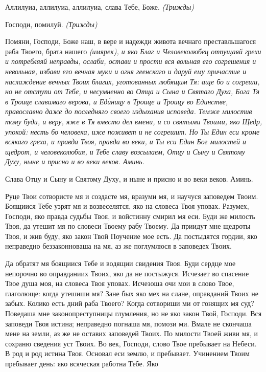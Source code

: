    Аллилуиа, аллилуиа, аллилуиа, слава Тебе, Боже. \itshape (Трижды)\normalfont{}


   Господи, помилуй. \itshape (Трижды)\normalfont{}


   Помяни, Господи, Боже наш, в вере и надежди живота вечнаго преставльшагося
раба Твоего, брата нашего \itshape (имярек)\normalfont{}, и яко Благ и Человеколюбец отпущаяй
грехи и потребляяй неправды, ослаби, остави и прости вся вольная его
согрешения и невольная, избави его вечная муки и огня геенскаго и даруй ему
причастие и наслаждение вечных Твоих благих, уготованных любящим Тя:
аще бо и согреши, но не отступи от Тебе, и несумненно во Отца и Сына и
Святаго Духа, Бога Тя в Троице славимаго верова, и Еди́ницу в Троице и
Троицу во Единстве, православно даже до последняго своего издыхания
исповеда. Темже милостив тому буди, и веру, яже в Тя вместо дел вмени, и со
святыми Твоими, яко Щедр, упокой: несть бо человека, иже поживет и не
согрешит. Но Ты Един еси кроме всякаго греха, и правда Твоя, правда во веки,
и Ты еси Един Бог милостей и щедрот, и человеколюбия, и Тебе славу
возсылаем, Отцу и Сыну и Святому Духу, ныне и присно и во веки веков.
Аминь.


   Слава Отцу и Сыну и Святому Духу, и ныне и присно и во веки веков.
Аминь.

   Руце Твои сотвористе мя и создасте мя, вразуми мя, и научуся
заповедем Твоим. Боящиися Тебе узрят мя и возвеселятся, яко на
словеса Твоя уповах. Разумех, Господи, яко правда судьбы Твоя, и
войстинну смирил мя еси. Буди же милость Твоя, да утешит мя по
словеси Твоему рабу Твоему. Да приидут мне щедроты Твоя, и жив
буду, яко закон Твой Поучение мое есть. Да постыдятся гордии, яко
неправедно беззаконноваша на мя, аз же поглумлюся в заповедех
Твоих.


   Да обратят мя боящиися Тебе и водящии свидения Твоя. Буди сердце мое
непорочно во оправданиих Твоих, яко да не постыжуся. Исчезает во спасение
Твое душа моя, на словеса Твоя уповах. Исчезоша очи мои в слово
Твое, глаголюще: когда утешиши мя? Зане бых яко мех на слане,
оправданий Твоих не забых. Колико есть дний раба Твоего? Когда
сотвориши ми от гонящих мя суд? Поведаша мне законопреступницы
глумления, но не яко закон Твой, Господи. Вся заповеди Твоя истина;
неправедно погнаша мя, помози ми. Вмале не скончаша мене на земли,
аз же не оставих заповедей Твоих. По милости Твоей живи мя, и
сохраню сведения уст Твоих. Во век, Господи, слово Твое пребывает на
Небеси. В род и род истина Твоя. Основал еси землю, и пребывает.
Учинением Твоим пребывает день: яко всяческая работна Тебе. Яко

